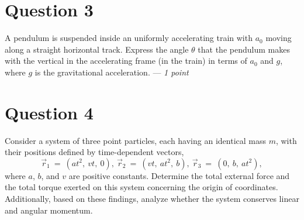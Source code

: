 \documentclass[a4paper,12pt]{article}
\begin{document}
\section*{Question 3}
A pendulum is suspended inside an uniformly accelerating train with $a_0$ moving along a straight horizontal track. Express the angle $\theta$  that the pendulum makes with the vertical in the accelerating frame (in the train) in terms of $a_0$ and $g$, where $g$ is the gravitational acceleration. --- \textit{1 point}

\section*{Question 4}
Consider a system of three point particles, each having an identical mass $m$, with their positions defined by time-dependent vectors,
\begin{equation*}
    \vec r_{1}~=~(at^2,~vt,~0),~\vec r_{2}~=~(vt,~at^2,~b),~\vec r_{3}~=~(0,~b,~at^2), 
\end{equation*}
where $a$, $b$, and $v$ are positive constants. Determine the total external force and the total torque exerted on this system concerning the origin of coordinates. Additionally, based on these findings, analyze whether the system conserves linear and angular momentum.
\end{document}
